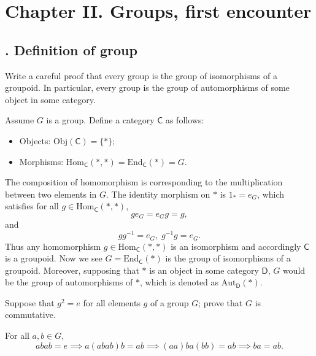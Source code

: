 \documentclass[12pt,letterpaper,boxed]{hmcpset}
\begin{document}
\newpage
\section{Chapter II.\hspace{0.2em} Groups, first encounter}

\subsection{. Definition of group}
\begin{problem}[1.1]
	Write a careful proof that every group is the group of isomorphisms of a groupoid. In particular, every group is the group of automorphisms of some object in some category.
\end{problem}
\begin{solution}
	Assume $G$ is a group. Define a category $\mathsf{C}$ as follows:
	\begin{itemize}
		\item Objects: $\mathrm{Obj}(\mathsf{C})=\{*\}$;
		\item Morphisms: $\mathrm{Hom}_\mathsf{C}(*,*)=\mathrm{End}_\mathsf{C}(*)=G$.
	\end{itemize}	
	The composition of homomorphism is corresponding to the multiplication between two elements in $G$. The identity morphism on $*$ is $1_*=e_G$, which satisfies for all $g\in \mathrm{Hom}_\mathsf{C}(*,*)$,
	\[
	ge_G=e_Gg=g,
	\]
	and
	\[
	gg^{-1}=e_G,\;g^{-1}g=e_G.
	\]
	Thus any homomorphism $g\in \mathrm{Hom}_\mathsf{C}(*,*)$ is an isomorphism and accordingly $\mathsf{C}$ is a groupoid. Now we see $G=\mathrm{End}_\mathsf{C}(*)$ is the group of isomorphisms of a groupoid. Moreover, supposing that $*$ is an object in some category $\mathsf{D}$, $G$ would be the group of automorphisms of $*$, which is denoted as $\mathrm{Aut}_\mathsf{D}(*)$.
\end{solution}

\begin{problem}[1.4]
	Suppose that $g^2 = e$ for all elements $g$ of a group $G$; prove that $G$ is commutative.
\end{problem}
\begin{solution}
	For all $a,b\in G$,
	\[
	abab=e\implies a(abab)b=ab\implies (aa)ba(bb)=ab\implies ba=ab.
	\]
\end{solution}
\end{document}
